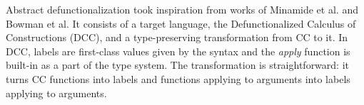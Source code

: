 Abstract defunctionalization took inspiration from works of Minamide et al. and Bowman et al. It consists of a target language, the Defunctionalized Calculus of Constructions (DCC), and a type-preserving transformation from CC to it. 
In DCC, labels are first-class values given by the syntax and the \textit{apply} function is built-in as a part of the type system. The transformation is straightforward: it turns CC functions into labels and functions applying to arguments into labels applying to arguments.











